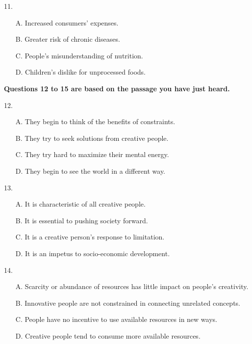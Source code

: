 \documentclass[UTF8,11pt]{ctexart}
\begin{document}
11.


\begin{itemize}[leftmargin=2em,itemsep=.2em,topsep=.4em]\item[A.] Increased consumers’ expenses.
\item[B.] Greater risk of chronic diseases.
\item[C.] People’s misunderstanding of nutrition.
\item[D.] Children’s dislike for unprocessed foods.
\end{itemize}

\textbf{Questions 12 to 15 are based on the passage you have just heard.}


12.


\begin{itemize}[leftmargin=2em,itemsep=.2em,topsep=.4em]\item[A.] They begin to think of the benefits of constraints.
\item[B.] They try to seek solutions from creative people.
\item[C.] They try hard to maximize their mental energy.
\item[D.] They begin to see the world in a different way.
\end{itemize}

13.


\begin{itemize}[leftmargin=2em,itemsep=.2em,topsep=.4em]\item[A.] It is characteristic of all creative people.
\item[B.] It is essential to pushing society forward.
\item[C.] It is a creative person’s response to limitation.
\item[D.] It is an impetus to socio-economic development.
\end{itemize}

14.


\begin{itemize}[leftmargin=2em,itemsep=.2em,topsep=.4em]\item[A.] Scarcity or abundance of resources has little impact on people’s creativity.
\item[B.] Innovative people are not constrained in connecting unrelated concepts.
\item[C.] People have no incentive to use available resources in new ways.
\item[D.] Creative people tend to consume more available resources.
\end{itemize}
\end{document}
